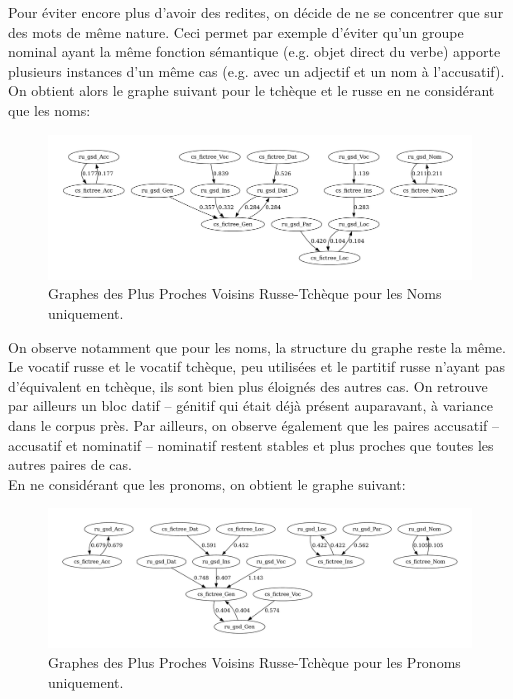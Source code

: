 \documentclass{cours}
\begin{document}
    Pour éviter encore plus d'avoir des redites, on décide de ne se concentrer que sur des mots de même nature.
    Ceci permet par exemple d'éviter qu'un groupe nominal ayant la même fonction sémantique (e.g. objet direct du verbe) apporte plusieurs instances d'un même cas (e.g. avec un adjectif et un nom à l'accusatif).
    On obtient alors le graphe suivant pour le tchèque et le russe en ne considérant que les noms:
    \begin{figure}[H]
	    \centering
	    \includegraphics[width=\textwidth]{Figures/GNN/gnn_ru_gsd_cs_fictree_Nouns_Only}
	    \caption{Graphes des Plus Proches Voisins Russe-Tchèque pour les Noms uniquement.}
    \end{figure}
    On observe notamment que pour les noms, la structure du graphe reste la même.
    Le vocatif russe et le vocatif tchèque, peu utilisées et le partitif russe n'ayant pas d'équivalent en tchèque, ils sont bien plus éloignés des autres cas.
    On retrouve par ailleurs un bloc datif -- génitif qui était déjà présent auparavant, à variance dans le corpus près.
    Par ailleurs, on observe également que les paires accusatif -- accusatif et nominatif -- nominatif restent stables et plus proches que toutes les autres paires de cas.\\
    En ne considérant que les pronoms, on obtient le graphe suivant:
    \begin{figure}[H]
	    \centering
	    \includegraphics[width=\textwidth]{Figures/GNN/gnn_ru_gsd_cs_fictree_Pronouns_Only}
	    \caption{Graphes des Plus Proches Voisins Russe-Tchèque pour les Pronoms uniquement.}
    \end{figure}
\end{document}
